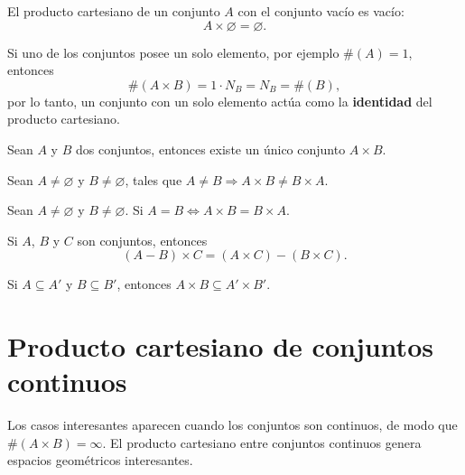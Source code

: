 \begin{definicion}
El producto cartesiano de un conjunto $A$ con el conjunto vacío es vacío:
\[
A \times \varnothing = \varnothing .
\]
\end{definicion}

Si uno de los conjuntos posee un solo elemento, por ejemplo $\#(A) = 1$,
entonces
\[
\#(A\times B) = 1\cdot N_B = N_B = \#(B),
\]
por lo tanto, un conjunto con un solo elemento actúa como la \textbf{identidad}
del producto cartesiano.

\begin{axiomac}
Sean $A$ y $B$ dos conjuntos, entonces existe un único conjunto
$A \times B$.
\end{axiomac}

\begin{proposicionc}
Sean $A \neq \varnothing$ y $B \neq \varnothing$, tales que
$A \neq B \Rightarrow A \times B \neq B \times A$.
\end{proposicionc}

\begin{proposicionc}
Sean $A \neq \varnothing$ y $B \neq \varnothing$. Si $A = B \Leftrightarrow
A \times B = B \times A$.
\end{proposicionc}

\begin{proposicionc}
Si $A$, $B$ y $C$ son conjuntos, entonces
\[
(A - B) \times C = (A \times C) - (B \times C).
\]
\end{proposicionc}

\begin{proposicionc}
Si $A \subseteq A'$ y $B \subseteq B'$, entonces $A \times B \subseteq A'
\times B'$.
\end{proposicionc}

\section{Producto cartesiano de conjuntos continuos}

Los casos interesantes aparecen cuando los conjuntos son continuos, de modo
que $\#(A \times B) = \infty$. El producto cartesiano entre conjuntos
continuos genera espacios geométricos interesantes.

